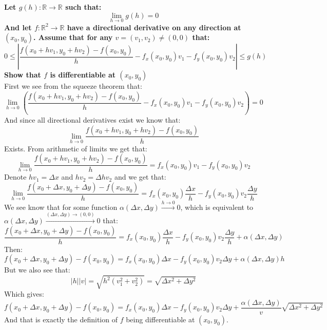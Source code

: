 \documentclass{article}
\theoremstyle{plain}
\newcommand{\R}{\mathbb{R}}
\begin{document}
	\newpage
	
	\textbf{Let $g(h)\colon\R\to\R$ such that:
	\[
		\lim_{h\to0}{g(h)}=0
	\]
	And let $f\colon\R^2\to\R$ have a directional derivative on any direction at 
	$(x_0,y_0)$. Assume that for any $v=(v_1,v_2)\neq(0,0)$ that:
	\[
		0 \le \left\vert
		\frac{f(x_0+hv_1, y_0+hv_2) - f(x_0,y_0)}{h} - 
		f_x(x_0,y_0)v_1 - f_y(x_0,y_0)v_2 
		\right\vert
		\le g(h)
	\]
	Show that $f$ is differentiable at $(x_0,y_0)$} \\
	First we see from the squeeze theorem that:
	\[
		\lim_{h\to 0}\left(\frac{f(x_0+hv_1, y_0+hv_2) - f(x_0,y_0)}{h} - 
		f_x(x_0,y_0)v_1 - f_y(x_0,y_0)v_2\right) = 0
	\]
	And since all directional derivatives exist we know that:
	\[
		\lim_{h\to 0}\frac{f(x_0+hv_1, y_0+hv_2) - f(x_0,y_0)}{h}
	\]
	Exists. From arithmetic of limits we get that:
	\[
		\lim_{h\to 0}\frac{f(x_0+hv_1, y_0+hv_2) - f(x_0,y_0)}{h} = 
		f_x(x_0,y_0)v_1 - f_y(x_0,y_0)v_2
	\]
	Denote $hv_1 = \Delta x$ and $hv_2 = \Delta hv_2$ and we get that:
	\[
		\lim_{h\to 0}\frac{f(x_0+\Delta x, y_0+\Delta y) - f(x_0,y_0)}{h} = 
		f_x(x_0,y_0)\frac{\Delta x}{h} - f_y(x_0,y_0)v_2\frac{\Delta y}{h}
	\]
	We see know that for some function 
	$\alpha(\Delta x, \Delta y) \xrightarrow{h\to 0} 0$, which is equivalent to
	$\alpha(\Delta x, \Delta y) \xrightarrow{(\Delta x, \Delta y)\to (0,0)} 0$
	that:
	\[
		\frac{f(x_0+\Delta x, y_0+\Delta y) - f(x_0,y_0)}{h} = 
		f_x(x_0,y_0)\frac{\Delta x}{h} - f_y(x_0,y_0)v_2\frac{\Delta y}{h} + 
		\alpha(\Delta x, \Delta y)
	\]
	Then:
	\[
		f(x_0+\Delta x, y_0+\Delta y) - f(x_0,y_0) = 
		f_x(x_0,y_0){\Delta x} - f_y(x_0,y_0)v_2{\Delta y} + 
		\alpha(\Delta x, \Delta y)h
	\]
	But we also see that:
	\[
		|h||v| = \sqrt{h^2(v_1^2 + v_2^2)} = \sqrt{\Delta x^2 + \Delta y^2}
	\]
	Which gives:
	\[
		f(x_0+\Delta x, y_0+\Delta y) - f(x_0,y_0) = 
		f_x(x_0,y_0){\Delta x} - f_y(x_0,y_0)v_2{\Delta y} + 
		\frac{\alpha(\Delta x, \Delta y)}{v}\sqrt{\Delta x^2 + \Delta y^2}
	\]
	And that is exactly the definition of $f$ being differentiable at 
	$(x_0,y_0)$.
	
	\newpage
	
\end{document}
